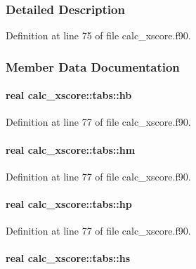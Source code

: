 \subsubsection{Detailed Description}


Definition at line 75 of file calc\-\_\-xscore.\-f90.



\subsubsection{Member Data Documentation}
\hypertarget{structcalc__xscore_1_1tabs_aec756f565720260b3581f274b7f677f4}{
\paragraph[{hb}]{\setlength{\rightskip}{0pt plus 5cm}real calc\-\_\-xscore\-::tabs\-::hb}}\label{structcalc__xscore_1_1tabs_aec756f565720260b3581f274b7f677f4}


Definition at line 77 of file calc\-\_\-xscore.\-f90.

\hypertarget{structcalc__xscore_1_1tabs_a7e93d107af5a735c6718bd954f23c534}{
\paragraph[{hm}]{\setlength{\rightskip}{0pt plus 5cm}real calc\-\_\-xscore\-::tabs\-::hm}}\label{structcalc__xscore_1_1tabs_a7e93d107af5a735c6718bd954f23c534}


Definition at line 77 of file calc\-\_\-xscore.\-f90.

\hypertarget{structcalc__xscore_1_1tabs_a81835040b328cd9cb62f8985135ee89f}{
\paragraph[{hp}]{\setlength{\rightskip}{0pt plus 5cm}real calc\-\_\-xscore\-::tabs\-::hp}}\label{structcalc__xscore_1_1tabs_a81835040b328cd9cb62f8985135ee89f}


Definition at line 77 of file calc\-\_\-xscore.\-f90.

\hypertarget{structcalc__xscore_1_1tabs_a757e19540cb2c6312ac4853cbf76b7de}{
\paragraph[{hs}]{\setlength{\rightskip}{0pt plus 5cm}real calc\-\_\-xscore\-::tabs\-::hs}}\label{structcalc__xscore_1_1tabs_a757e19540cb2c6312ac4853cbf76b7de}


